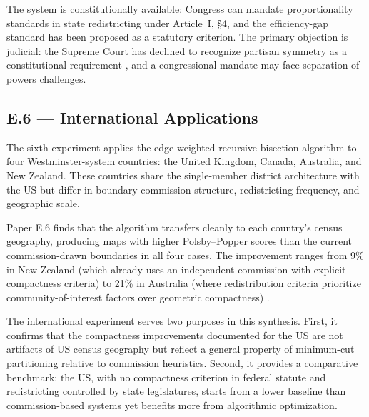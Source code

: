 The system is constitutionally available: Congress can mandate proportionality
standards in state redistricting under Article~I, \S4, and the efficiency-gap
standard has been proposed as a statutory criterion.  The primary objection is
judicial: the Supreme Court has declined to recognize partisan symmetry as
a constitutional requirement \citep{rucho2019}, and a congressional mandate
may face separation-of-powers challenges.

\subsection{E.6 --- International Applications}

The sixth experiment applies the edge-weighted recursive bisection algorithm to
four Westminster-system countries: the United Kingdom, Canada, Australia, and
New Zealand.  These countries share the single-member district architecture
with the US but differ in boundary commission structure, redistricting frequency,
and geographic scale.

Paper E.6 finds that the algorithm transfers cleanly to each country's census
geography, producing maps with higher Polsby--Popper scores than the current
commission-drawn boundaries in all four cases.  The improvement ranges from
9\% in New Zealand (which already uses an independent commission with explicit
compactness criteria) to 21\% in Australia (where redistribution criteria
prioritize community-of-interest factors over geometric compactness)
\citep{dellaLibera2026e6}.

The international experiment serves two purposes in this synthesis.  First, it
confirms that the compactness improvements documented for the US are not
artifacts of US census geography but reflect a general property of
minimum-cut partitioning relative to commission heuristics.  Second, it
provides a comparative benchmark: the US, with no compactness criterion in
federal statute and redistricting controlled by state legislatures, starts from
a lower baseline than commission-based systems yet benefits more from
algorithmic optimization.
